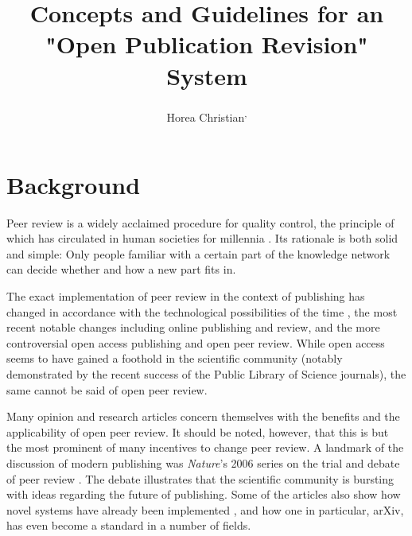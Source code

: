 
\title{Concepts and Guidelines for an "Open Publication Revision" System} %
\posttitle{\par\end{flushleft}}

\author{Horea Christian\protect{}\textsuperscript{,}\protect{}
		} %
\postauthor{\par\end{flushleft}\HorRule}

\date{\color{Aubergine}} %


\maketitle
\thispagestyle{fancy} %
\noindent\textbf{} %

\section{Background}
Peer review is a widely acclaimed procedure for quality control, the principle of which has circulated in human societies for millennia \cite{Spier2002}.
Its rationale is both solid and simple: Only people familiar with a certain part of the knowledge network can decide whether and how a new part fits in. 

The exact implementation of peer review in the context of publishing has changed in accordance with the technological possibilities of the time \cite{Spier2002}, the most recent notable changes including online publishing and review, and the more controversial open access publishing\cite{VanNoorden2013,Parker2013} and open peer review.
While open access seems to have gained a foothold in the scientific community (notably demonstrated by the recent success of the Public Library of Science journals), the same cannot be said of open peer review.

Many opinion and research articles concern themselves with the benefits\cite{Leek2011,Mainguy2005} and the applicability\cite{vanRooyen1999,vanRooyen2010} of open peer review. 
It should be noted, however, that this is but the most prominent of many incentives to change peer review.
A landmark of the discussion of modern publishing was \textit{Nature}'s 2006 series on the trial and debate of peer review \cite{Nature-debate2006}.
The debate illustrates that the scientific community is bursting with ideas regarding the future of publishing. 
Some of the articles also show how novel systems have already been implemented \cite{Riley2006,Sandewall2006,Koop2006}, and how one in particular, arXiv\cite{arXiv}, has even become a standard in a number of fields.

